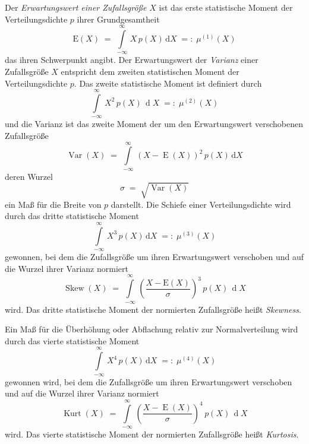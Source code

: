 Der \textsl{Erwartungswert einer Zufallsgröße} $X$ ist das erste statistische Moment
der Verteilungsdichte $p$ ihrer Grundgesamtheit
\begin{equation}
\mathrm{E}(X) \; = \; \int\limits_{-\infty}^{\infty} \, X \, p(X) \, \mathrm{d} X \; =: \; \mu^{(1)}(X)
\end{equation}
das ihren Schwerpunkt angibt.
Der Erwartungswert der \textsl{Varianz}
einer Zufallsgröße $X$ entspricht dem zweiten statistischen Moment
der Verteilungsdichte $p$.
Das zweite statistische Moment ist definiert durch
\begin{equation}
\int\limits_{-\infty}^{\infty} \, X^2 \, p(X) \, \operatorname{d} X \; =: \; \mu^{(2)}(X)
\end{equation}
und die Varianz ist das zweite Moment der um den Erwartungswert verschobenen Zufallsgröße
\begin{equation}
\operatorname{Var}(X) \; = \; \int\limits_{-\infty}^{\infty} \, (X - \operatorname{E}(X))^2 \,
 p(X) \, \mathrm{d} X
\end{equation}
deren Wurzel
\begin{equation}
\sigma \; = \; \sqrt{\operatorname{Var}(X)}
\end{equation}
ein Maß für die Breite von $p$ darstellt.
Die Schiefe einer Verteilungsdichte wird durch das dritte statistische Moment
\begin{equation}
\int\limits_{-\infty}^{\infty} \, X^3 \, p(X) \, \mathrm{d} X \; =: \; \mu^{(3)}(X)
\end{equation}
gewonnen, bei dem die Zufallsgröße um ihren Erwartungswert verschoben und auf die Wurzel ihrer
Varianz normiert
\begin{equation}
\operatorname{Skew}(X) \; = \; \int\limits_{-\infty}^{\infty} \, \left(\frac{X - \mathrm{E}(X)}{\sigma}
\right)^3 \, p(X) \, \operatorname{d} X
\end{equation}
wird. Das dritte statistische Moment der normierten Zufallsgröße heißt
\textsl{Skewness}.

Ein Maß für die Überhöhung oder Abflachung relativ zur Normalverteilung wird durch
das vierte statistische Moment
\begin{equation}
\int\limits_{-\infty}^{\infty} \, X^4 \, p(X) \, \mathrm{d} X \; =: \; \mu^{(4)}(X)
\end{equation}
gewonnen wird, bei dem die Zufallsgröße um ihren Erwartungswert verschoben und auf die Wurzel ihrer
Varianz normiert
\begin{equation}
\operatorname{Kurt}(X) \; = \;  \int\limits_{-\infty}^{\infty} \, \left(\frac{X - \operatorname{E}(X)}{\sigma}
\right)^4 \, p(X) \, \operatorname{d} X
\end{equation}
wird. Das vierte statistische Moment der normierten Zufallsgröße heißt
\textsl{Kurtosis}.

